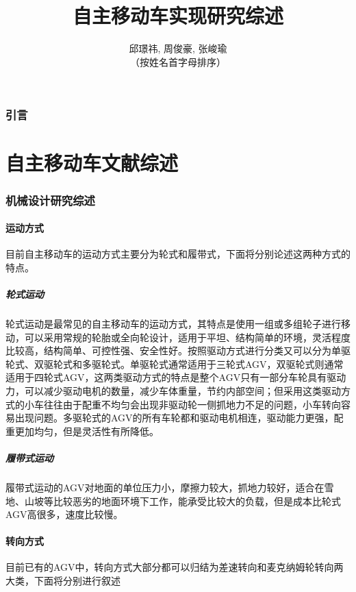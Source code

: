 \documentclass{paper}
\title{自主移动车实现研究综述}
\author{邱璟祎, 周俊豪, 张峻瑜\\
  （按姓名首字母排序）
}
\begin{document}
\maketitle
\tableofcontents
\newpage
\section{引言}

\part{自主移动车文献综述}
\label{sec:label}


\section{机械设计研究综述}
\subsection{运动方式}
\label{subsec:label}
目前自主移动车的运动方式主要分为轮式和履带式，下面将分别论述这两种方式的特点。
\subsubsection{轮式运动}
\label{subsec:label}
轮式运动是最常见的自主移动车的运动方式，其特点是使用一组或多组轮子进行移动，可以采用常规的轮胎或全向轮设计，适用于平坦、结构简单的环境，灵活程度比较高，结构简单、可控性强、安全性好。按照驱动方式进行分类又可以分为单驱轮式、双驱轮式和多驱轮式。单驱轮式通常适用于三轮式AGV，双驱轮式则通常适用于四轮式AGV，这两类驱动方式的特点是整个AGV只有一部分车轮具有驱动力，可以减少驱动电机的数量，减少车体重量，节约内部空间；但采用这类驱动方式的小车往往由于配重不均匀会出现非驱动轮一侧抓地力不足的问题，小车转向容易出现问题。多驱轮式的AGV的所有车轮都和驱动电机相连，驱动能力更强，配重更加均匀，但是灵活性有所降低。
\subsubsection{履带式运动}
\label{subsec:label}
履带式运动的AGV对地面的单位压力小，摩擦力较大，抓地力较好，适合在雪地、山坡等比较恶劣的地面环境下工作，能承受比较大的负载，但是成本比轮式AGV高很多，速度比较慢。
\subsection{转向方式}
\label{subsec:label}
目前已有的AGV中，转向方式大部分都可以归结为差速转向和麦克纳姆轮转向两大类，下面将分别进行叙述
\end{document}
